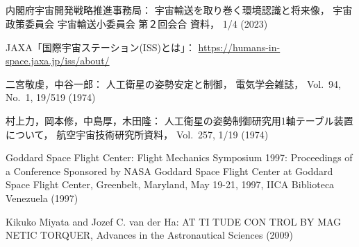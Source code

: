 \begin{center}
\section*{}                      %
\vspace*{-2zh}
\end{center}

\begin{thebibliography}{99}
	内閣府宇宙開発戦略推進事務局：
	宇宙輸送を取り巻く環境認識と将来像，
	宇宙政策委員会 宇宙輸送小委員会 第２回会合 資料，
	1/4 (2023)

	JAXA「国際宇宙ステーション(ISS)とは」：
	\url{https://humans-in-space.jaxa.jp/iss/about/}

	二宮敬虔，中谷一郎：
	人工衛星の姿勢安定と制御，
	電気学会雑誌，
	Vol.~94, No.~1, 19/519 (1974)

	村上力，岡本修，中島厚，木田隆：
	人工衛星の姿勢制御研究用1軸テーブル装置について，
	航空宇宙技術研究所資料，
	Vol.~257, 1/19 (1974)

	Goddard Space Flight Center:
	Flight Mechanics Symposium 1997: Proceedings of a Conference Sponsored by NASA Goddard
	 Space Flight Center at Goddard Space Flight Center, Greenbelt, Maryland, May 19-21, 1997,
	 IICA Biblioteca Venezuela (1997)

	Kikuko Miyata and Jozef C. van der Ha:
	AT TI TUDE CON TROL BY MAG NETIC TORQUER,
	Advances in the Astronautical Sciences (2009)

	
	

	
	

\end{thebibliography}
